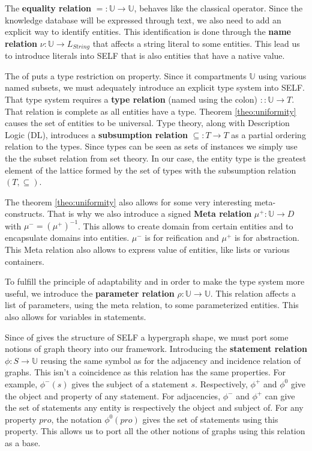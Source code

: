 \documentclass[11pt,a4paper,twoside,openright,titlepage,numbers=noenddot,headinclude,cleardoublepage=empty,openany]{scrreprt}
\theoremstyle{plain}
\theoremstyle{definition}
\theoremstyle{remark}
\newcommand{\bb}{\mathbb}
\begin{document}
The \textbf{equality relation} \(= : \bb{U} \to \bb{U}\), behaves like
the classical operator. Since the knowledge database will be expressed
through text, we also need to add an explicit way to identify entities.
This identification is done through the \textbf{name relation}
\(\nu: \bb{U} \to L_{String}\) that affects a string literal to some
entities. This lead us to introduce literals into SELF that is also
entities that have a native value.

The  of  puts a type
restriction on property. Since it compartments \(\bb{U}\) using various
named subsets, we must adequately introduce an explicit type system into
SELF. That type system requires a \textbf{type relation} (named using
the colon) \(: : \bb{U} \to T\). That relation is complete as all
entities have a type. Theorem \ref{theo:uniformity} causes the set of
entities to be universal. Type theory, along with Description Logic
(DL), introduces a \textbf{subsumption relation} \(\subseteq : T \to T\)
as a partial ordering relation to the types. Since types can be seen as
sets of instances we simply use the the subset relation from set theory.
In our case, the entity type is the greatest element of the lattice
formed by the set of types with the subsumption relation
\((T, \subseteq)\).

The theorem \ref{theo:uniformity} also allows for some very interesting
meta-constructs. That is why we also introduce a signed \textbf{Meta
relation} \(\mu^+: \bb{U} \to D\) with \(\mu^- = (\mu^+)^{-1}\). This
allows to create domain from certain entities and to encapsulate domains
into entities. \(\mu^-\) is for reification and \(\mu^+\) is for
abstraction. This Meta relation also allows to express value of
entities, like lists or various containers.

To fulfill the principle of adaptability and in order to make the type
system more useful, we introduce the \textbf{parameter relation}
\(\rho: \bb{U} \to \bb{U}\). This relation affects a list of parameters,
using the meta relation, to some parameterized entities. This also
allows for variables in statements.

Since  of  gives the
structure of SELF a hypergraph shape, we must port some notions of graph
theory into our framework. Introducing the \textbf{statement relation}
\(\phi : S \to \bb{U}\) reusing the same symbol as for the adjacency and
incidence relation of graphs. This isn't a coincidence as this relation
has the same properties. For example, \(\phi^-(s)\) gives the subject of
a statement \(s\). Respectively, \(\phi^+\) and \(\phi^0\) give the
object and property of any statement. For adjacencies, \(\phi^-\) and
\(\phi^+\) can give the set of statements any entity is respectively the
object and subject of. For any property \(pro\), the notation
\(\phi^0(pro)\) gives the set of statements using this property. This
allows us to port all the other notions of graphs using this relation as
a base.
\end{document}
